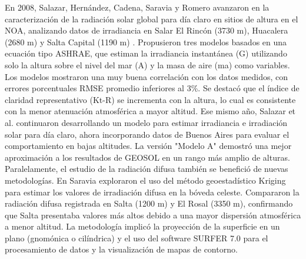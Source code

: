 En 2008, Salazar, Hernández, Cadena, Saravia y Romero avanzaron en la caracterización de la radiación solar global para día claro en sitios de altura en el NOA, analizando datos de irradiancia en Salar El Rincón (3730 m), Huacalera (2680 m) y Salta Capital (1190 m) \cite{Salazar2008a}. Propusieron tres modelos basados en una ecuación tipo ASHRAE, que estiman la irradiancia instantánea (G) utilizando solo la altura sobre el nivel del mar (A) y la masa de aire (ma) como variables. Los modelos mostraron una muy buena correlación con los datos medidos, con errores porcentuales RMSE promedio inferiores al 3\%. Se destacó que el índice de claridad representativo (Kt-R) se incrementa con la altura, lo cual es consistente con la menor atenuación atmosférica a mayor altitud. Ese mismo año, Salazar et al. continuaron desarrollando un modelo para estimar irradiancia e irradiación solar para día claro, ahora incorporando datos de Buenos Aires para evaluar el comportamiento en bajas altitudes. La versión "Modelo A" demostró una mejor aproximación a los resultados de GEOSOL en un rango más amplio de alturas.\\

Paralelamente, el estudio de la radiación difusa también se benefició de nuevas metodologías. En \cite{Salazar2008b} Saravia exploraron el uso del método geoestadístico Kriging para estimar los valores de irradiación difusa en la bóveda celeste. Compararon la radiación difusa registrada en Salta (1200 m) y El Rosal (3350 m), confirmando que Salta presentaba valores más altos debido a una mayor dispersión atmosférica a menor altitud. La metodología implicó la proyección de la superficie en un plano (gnomónica o cilíndrica) y el uso del software SURFER 7.0 para el procesamiento de datos y la visualización de mapas de contorno.\\



